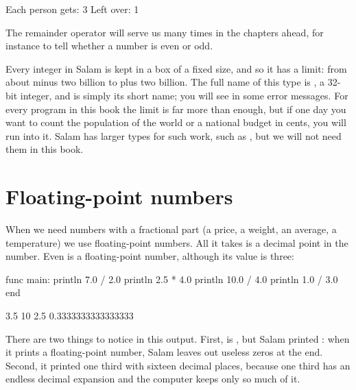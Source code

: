 \begin{salamout}
Each person gets: 3
Left over: 1
\end{salamout}

The remainder operator will serve us many times in the chapters ahead, for
instance to tell whether a number is even or odd.

\begin{deep}
Every integer in Salam is kept in a box of a fixed size, and so it has a
limit: from about minus two billion to plus two billion. The full name of
this type is , a 32-bit integer, and  is simply its
short name; you will see  in some error messages. For every
program in this book the limit is far more than enough, but if one day you
want to count the population of the world or a national budget in cents,
you will run into it. Salam has larger types for such work, such as
, but we will not need them in this book.
\end{deep}

\section{Floating-point numbers}

When we need numbers with a fractional part (a price, a weight, an average,
a temperature) we use floating-point numbers. All it takes is a decimal point
in the number. Even  is a floating-point number, although its value
is three:

\begin{salamcode}
func main:
    println 7.0 / 2.0
    println 2.5 * 4.0
    println 10.0 / 4.0
    println 1.0 / 3.0
end
\end{salamcode}

\begin{salamout}
3.5
10
2.5
0.3333333333333333
\end{salamout}

There are two things to notice in this output. First,  is
, but Salam printed : when it prints a floating-point
number, Salam leaves out useless zeros at the end. Second, it printed one
third with sixteen decimal places, because one third has an endless decimal
expansion and the computer keeps only so much of it.

